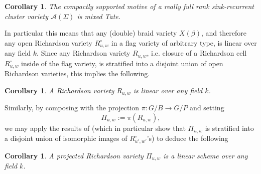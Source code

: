 \documentclass[11pt]{amsart}
\newtheorem{cor}[thm]{Corollary}
\theoremstyle{definition}
\theoremstyle{remark}
\numberwithin{equation}{section}
\begin{document}
\begin{cor}\label{sink-recurrent MT}
    The compactly supported motive of a really full rank sink-recurrent cluster variety $\mathcal{A}(\Sigma)$ is mixed Tate.
\end{cor}

    

In particular this means that any (double) braid variety $X(\beta)$, and therefore any open Richardson variety $R_{u,w}^\circ$ in a flag variety of arbitrary type, is linear over any field $k$. %
Since any Richardson variety $R_{u,w}$, i.e. closure of a Richardson cell $R_{u,w}^\circ$ inside of the flag variety, is stratified into a disjoint union of open Richardson varieties, this implies the following.

\begin{cor}\label{first linear}
    A Richardson variety $R_{u,w}$ is linear over any field $k$.
\end{cor}

Similarly, by composing with the projection $\pi: G/B \rightarrow G/P$ and setting
\begin{equation}
    \Pi_{u,w} := \pi(R_{u,w}),
\end{equation} we may apply the results of \cite{MR3176610} (which in particular show that $\Pi_{u,w}$ is stratified into a disjoint union of isomorphic images of $R_{u',w'}^\circ$'s) to deduce the following

\begin{cor}
    A projected Richardson variety $\Pi_{u,w}$ is a linear scheme over any field $k$.
\end{cor}
\end{document}
